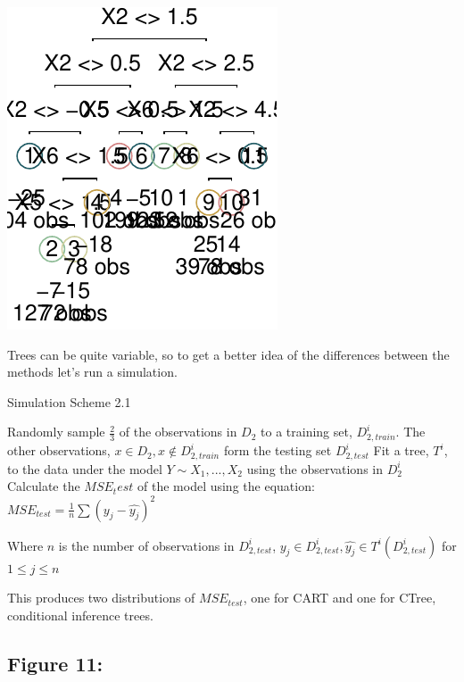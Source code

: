 \documentclass[12pt,twoside]{reedthesis}
\begin{document}
  \begin{center}\includegraphics{Thesis_files/figure-latex/fig10-2} \end{center}
  
  Trees can be quite variable, so to get a better idea of the differences
  between the methods let's run a simulation.
  
  \begin{algorithm}
  \caption{Simulation Scheme 2.1}
  \label{sim2.1}
  \begin{algorithmic}[1]
  \State Randomly sample $\frac 2 3$  of the observations in  $D_2$  to a training set,  $D_{2, train}^i$. The other observations,  $x \in D_2, x \notin D_{2, train}^i$ form the testing set $D_{2, test}^i$
  \State Fit a tree, $T^i$, to the data under the model $Y \sim X_1,...,X_2$ using the observations in      $D_{2}^i$
  \State Calculate the $MSE_test$ of the model using the equation:
      $MSE_{test} = \frac 1 n \sum (y_j - \hat{y_j})^2$
  \EndFor
  \end{algorithmic}
  \end{algorithm}
  
  Where \(n\) is the number of observations in \(D_{2, test}^i\),
  \(y_j \in D_{2, test}^i, \hat{y_j} \in T^i(D_{2, test}^i)\) for
  \(1 \leq j \leq n\)
  
  This produces two distributions of \(MSE_{test}\), one for CART and one
  for CTree, conditional inference trees.
  
  \subsection{Figure 11:}\label{figure-11}
  
\end{document}
